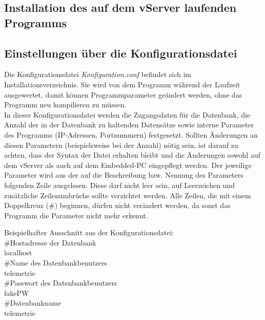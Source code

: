 \documentclass[fontsize = 12pt, paper = a4]{scrreprt}
\begin{document}
 \subsection{Installation des auf dem vServer laufenden Programms}
 
 
 \subsection{Einstellungen über die Konfigurationsdatei}
Die Konfigurationsdatei \textit{Konfiguration.conf} befindet sich im Installationsverzeichnis. Sie wird von dem Programm während der Laufzeit ausgewertet, damit können Programmparameter geändert werden, ohne das Programm neu kompilieren zu müssen.\\
In dieser Konfigurationsdatei werden die Zugangsdaten für die Datenbank, die Anzahl der in der Datenbank zu haltenden Datensätze sowie interne Parameter des Programms (IP-Adressen, Portnummern) festgesetzt.
Sollten Änderungen an diesen Parametern (beispielsweise bei der Anzahl) nötig sein, ist darauf zu achten, dass der Syntax der Datei erhalten bleibt und die Änderungen sowohl auf dem vServer als auch auf dem Embedded-PC eingepflegt werden.
Der jeweilige Parameter wird aus der auf die Beschreibung bzw. Nennung des Parameters folgenden Zeile ausgelesen. 
Diese darf nicht leer sein, auf Leerzeichen und zusätzliche Zeilenumbrüche sollte verzichtet werden.
Alle Zeilen, die mit einem Doppelkreuz (\#) beginnen, dürfen nicht verändert werden, da sonst das Programm die Parameter nicht mehr erkennt.

Beispielhafter Ausschnitt aus der Konfigurationsdatei:\\

    \#Hostadresse der Datenbank\\
    localhost\\

    \#Name des Datenbankbenutzers\\
    telemetrie\\

    \#Passwort des Datenbankbenutzers\\
    fakePW\\

    \#Datenbankname\\
    telemetrie\\
\end{document}
